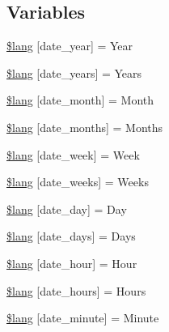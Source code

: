 \subsection*{Variables}
\begin{DoxyCompactItemize}
\item 
\hyperlink{date__lang_8php_ad344b819f5b881c0e2d75c994b8781b7}{\$lang} \mbox{[}\textquotesingle{}date\+\_\+year\textquotesingle{}\mbox{]} = \textquotesingle{}Year\textquotesingle{}
\item 
\hyperlink{date__lang_8php_ad553cabe66c6e6feff320f69fadfc561}{\$lang} \mbox{[}\textquotesingle{}date\+\_\+years\textquotesingle{}\mbox{]} = \textquotesingle{}Years\textquotesingle{}
\item 
\hyperlink{date__lang_8php_a27b6a453e0ff873f09050b0882b86b43}{\$lang} \mbox{[}\textquotesingle{}date\+\_\+month\textquotesingle{}\mbox{]} = \textquotesingle{}Month\textquotesingle{}
\item 
\hyperlink{date__lang_8php_af22d57f979004523c31e7252891b8ce1}{\$lang} \mbox{[}\textquotesingle{}date\+\_\+months\textquotesingle{}\mbox{]} = \textquotesingle{}Months\textquotesingle{}
\item 
\hyperlink{date__lang_8php_a027a67b9a8e626d4a9b4080f8100ca53}{\$lang} \mbox{[}\textquotesingle{}date\+\_\+week\textquotesingle{}\mbox{]} = \textquotesingle{}Week\textquotesingle{}
\item 
\hyperlink{date__lang_8php_af09796515b005d759204f911305a8459}{\$lang} \mbox{[}\textquotesingle{}date\+\_\+weeks\textquotesingle{}\mbox{]} = \textquotesingle{}Weeks\textquotesingle{}
\item 
\hyperlink{date__lang_8php_ab414526293ffead872f9b90ed4fdd552}{\$lang} \mbox{[}\textquotesingle{}date\+\_\+day\textquotesingle{}\mbox{]} = \textquotesingle{}Day\textquotesingle{}
\item 
\hyperlink{date__lang_8php_abb37886fce0ac3f342d17f4132740870}{\$lang} \mbox{[}\textquotesingle{}date\+\_\+days\textquotesingle{}\mbox{]} = \textquotesingle{}Days\textquotesingle{}
\item 
\hyperlink{date__lang_8php_a7a4e78ef1f19291c5a7818cf08bfa3ca}{\$lang} \mbox{[}\textquotesingle{}date\+\_\+hour\textquotesingle{}\mbox{]} = \textquotesingle{}Hour\textquotesingle{}
\item 
\hyperlink{date__lang_8php_ad1fe07226d651882b9ecce9cb2011db2}{\$lang} \mbox{[}\textquotesingle{}date\+\_\+hours\textquotesingle{}\mbox{]} = \textquotesingle{}Hours\textquotesingle{}
\item 
\hyperlink{date__lang_8php_a999a95f4f9c529af571d30f9615c93f3}{\$lang} \mbox{[}\textquotesingle{}date\+\_\+minute\textquotesingle{}\mbox{]} = \textquotesingle{}Minute\textquotesingle{}

\end{DoxyCompactItemize}
